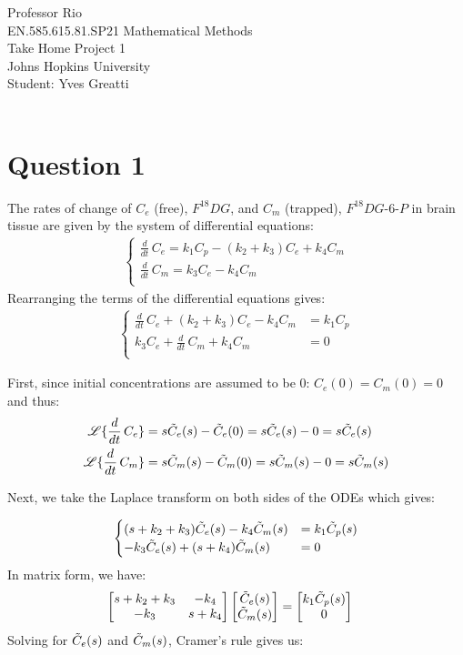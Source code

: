 \documentclass[11pt]{article}
\begin{document}
\noindent Professor Rio\\
EN.585.615.81.SP21 Mathematical Methods\\
Take Home Project 1\\
Johns Hopkins University\\
Student: Yves Greatti\\\

\section{Question 1}
The rates of change of $C_e$ (free), $F^{18}DG$,  and $C_m$ (trapped), $F^{18}DG$-$6$-$P$
in brain tissue  are given by the system of differential equations:
\begin{align*}
	\begin{cases}
		\frac{d}{dt} \, C_e  = k_1 C_p - (k_2 + k_3) C_e + k_4 C_m \\
		\frac{d}{dt} \, C_m = k_3 C_e -  k_4 C_m \\
	\end{cases}
\end{align*}
Rearranging the terms of the differential equations gives:
\begin{align*}
	\begin{cases}
		\frac{d}{dt} \, C_e  + (k_2 + k_3) C_e - k_4 C_m  &= k_1 C_p \\
		k_3 C_e + \frac{d}{dt} \, C_m + k_4 C_m  &= 0\\
	\end{cases}
\end{align*}

First, since initial concentrations are assumed to be $0$: $C_e(0) = C_m(0) = 0$ and thus:
\begin{align*}
\mathscr{L}\{ \frac{d}{dt} \, C_e  \} &= s \tilde{ C }_e(s) - \tilde{ C }_e(0) = s \tilde{ C }_e(s) - 0 = s \tilde{ C }_e(s) \\
\mathscr{L}\{ \frac{d}{dt} \, C_m  \} &= s \tilde{ C }_m(s) - \tilde{ C }_m(0) = s \tilde{ C }_m(s) - 0 = s \tilde{ C }_m(s) \\
\end{align*}

Next, we take the Laplace transform on both sides of the ODEs which gives:

\begin{align*}
	\begin{cases}
		(s + k_2 + k_3)  \tilde{ C }_e(s)  - k_4 \tilde{ C }_m(s) &= k_1 \tilde{ C }_p(s) \\
		-k_3  \tilde{ C }_e(s)  + (s + k_4) \tilde{ C }_m(s) &=  0
	\end{cases}
\end{align*}
 In matrix form, we have:
\begin{align*}
 \begin{bmatrix} s + k_2 + k_3 & -k_4 \\ -k_3 & s + k_4 \end{bmatrix} \begin{bmatrix}  \tilde{ C }_e(s) \\  \tilde{ C }_m(s) \end{bmatrix} &= \begin{bmatrix} k_1 \tilde{ C }_p(s)  \\ 0 \end{bmatrix}
\end{align*}
Solving for $\tilde{ C }_e(s)$ and $\tilde{ C }_m(s)$, Cramer's rule gives us:
\end{document}
